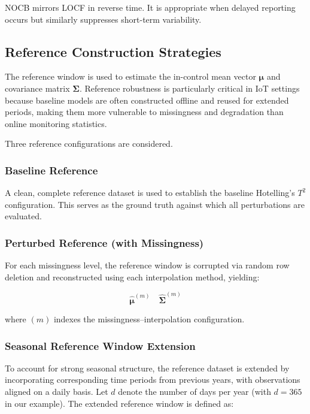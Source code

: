 \ac{NOCB} mirrors \ac{LOCF} in reverse time. It is appropriate when delayed reporting occurs but similarly suppresses short-term variability.

\subsection{Reference Construction Strategies}

The reference window is used to estimate the in-control mean vector $\boldsymbol{\mu}$ and covariance matrix $\boldsymbol{\Sigma}$. Reference robustness is particularly critical in \ac{IoT} settings because baseline models are often constructed offline and reused for extended periods, making them more vulnerable to missingness and degradation than online monitoring statistics.

Three reference configurations are considered.

\subsubsection{Baseline Reference}

A clean, complete reference dataset is used to establish the baseline Hotelling’s $T^2$ configuration. This serves as the ground truth against which all perturbations are evaluated.

\subsubsection{Perturbed Reference (with Missingness)}

For each missingness level, the reference window is corrupted via random row deletion and reconstructed using each interpolation method, yielding:

\begin{equation}
\widehat{\boldsymbol{\mu}}^{(m)} \quad \widehat{\boldsymbol{\Sigma}}^{(m)}
\label{eq:estimates}
\end{equation}


where $(m)$ indexes the missingness–interpolation configuration.

\subsubsection{Seasonal Reference Window Extension}

To account for strong seasonal structure, the reference dataset is extended by incorporating corresponding time periods from previous years, with observations aligned on a daily basis. Let \( d \) denote the number of days per year (with \( d = 365 \) in our example). The extended reference window is defined as:

